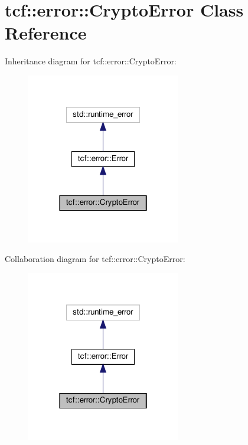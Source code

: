 \hypertarget{classtcf_1_1error_1_1CryptoError}{}\section{tcf\+:\+:error\+:\+:Crypto\+Error Class Reference}
\label{classtcf_1_1error_1_1CryptoError}


Inheritance diagram for tcf\+:\+:error\+:\+:Crypto\+Error\+:
\nopagebreak
\begin{figure}[H]
\begin{center}
\leavevmode
\includegraphics[width=190pt]{classtcf_1_1error_1_1CryptoError__inherit__graph}
\end{center}
\end{figure}


Collaboration diagram for tcf\+:\+:error\+:\+:Crypto\+Error\+:
\nopagebreak
\begin{figure}[H]
\begin{center}
\leavevmode
\includegraphics[width=190pt]{classtcf_1_1error_1_1CryptoError__coll__graph}
\end{center}
\end{figure}
